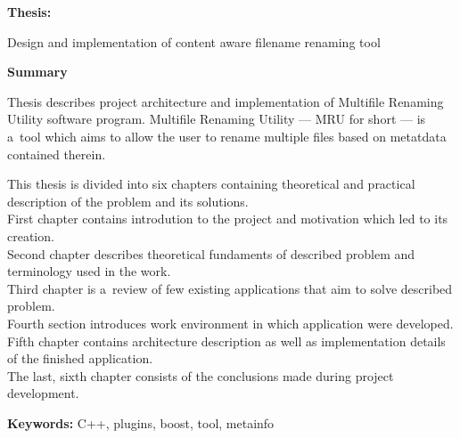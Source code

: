 \clearpage

\textbf{Thesis:}
\begin{center}
Design and implementation of content aware filename renaming tool
\end{center}

\begin{center}
\textbf{Summary}
\end{center}

\par
Thesis describes project architecture and implementation of Multifile Renaming Utility software program.
Multifile Renaming Utility --- MRU for short --- is a~tool which aims to allow the user to rename multiple files based on metatdata contained therein.

\par
This thesis is divided into six chapters containing theoretical and practical description of the problem and its solutions.\\
First chapter contains introdution to the project and motivation which led to its creation.\\
Second chapter describes theoretical fundaments of described problem and terminology used in the work.\\
Third chapter is a~review of few existing applications that aim to solve described problem.\\
Fourth section introduces work environment in which application were developed.\\
Fifth chapter contains architecture description as well as implementation details of the finished application.\\
The last, sixth chapter consists of the conclusions made during project development.

\vspace*{\baselineskip}

\noindent\textbf{Keywords:} C++, plugins, boost, tool, metainfo
